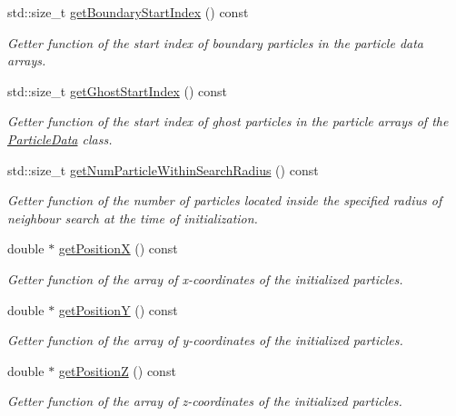 \begin{DoxyCompactItemize}
std\-::size\-\_\-t \hyperlink{classInitializer_ae9ff8c4f144f3dee1b14ec72e7c59157}{get\-Boundary\-Start\-Index} () const 
\begin{DoxyCompactList}\small\item\em Getter function of the start index of boundary particles in the particle data arrays. \end{DoxyCompactList}\item 
std\-::size\-\_\-t \hyperlink{classInitializer_a9458ff0d23312baa3f13f0ad8c96aaba}{get\-Ghost\-Start\-Index} () const 
\begin{DoxyCompactList}\small\item\em Getter function of the start index of ghost particles in the particle arrays of the \hyperlink{classParticleData}{Particle\-Data} class. \end{DoxyCompactList}\item 
std\-::size\-\_\-t \hyperlink{classInitializer_a85aa458bf8657237aa018fc0d01ecac9}{get\-Num\-Particle\-Within\-Search\-Radius} () const 
\begin{DoxyCompactList}\small\item\em Getter function of the number of particles located inside the specified radius of neighbour search at the time of initialization. \end{DoxyCompactList}\item 
double $\ast$ \hyperlink{classInitializer_a2b19b845e3fa7b7009fd97dab4e3e6a9}{get\-Position\-X} () const 
\begin{DoxyCompactList}\small\item\em Getter function of the array of x-\/coordinates of the initialized particles. \end{DoxyCompactList}\item 
double $\ast$ \hyperlink{classInitializer_a96d8812e9f8972d2f2461a691bb66ad5}{get\-Position\-Y} () const 
\begin{DoxyCompactList}\small\item\em Getter function of the array of y-\/coordinates of the initialized particles. \end{DoxyCompactList}\item 
double $\ast$ \hyperlink{classInitializer_a144439df028b3768b0c0ad7a8e4926c4}{get\-Position\-Z} () const 
\begin{DoxyCompactList}\small\item\em Getter function of the array of z-\/coordinates of the initialized particles. \end{DoxyCompactList}\item 

\end{DoxyCompactItemize}
